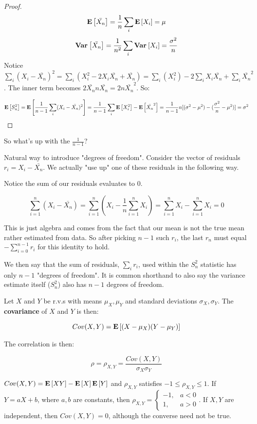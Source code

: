 \documentclass[10pt]{article}
\begin{document}
\begin{proof}
    \[\operatorname{\mathbf{E}}\left[\bar{X_n}\right] = \frac{1}{n}\sum_i \operatorname{\mathbf{E}}\left[X_i\right] = \mu\]
    \[\operatorname{\mathbf{Var}}_{}\left[\bar{X_n}\right] = \frac{1}{n^2}\sum_i \operatorname{\mathbf{Var}}_{}\left[X_i\right] = \frac{\sigma^2}{n}\]
    Notice $\sum_i (X_i - \bar{X_n})^2 = \sum_i (X_i^2 - 2 X_i \bar{X_n} +
    \bar{X_n}) = \sum_i (X_i^2) - 2 \sum_i {X_i \bar{X_n} + \sum_i
    \bar{X_n}^2}$. The inner term becomes $2 \bar{X_n} n \bar{X_n} =
    2n\bar{X_n}^2$. So:

    \[\operatorname{\mathbf{E}}\left[S^2_n\right] = \operatorname{\mathbf{E}}\left[\frac{1}{n-1} \sum_i (X_i - \bar{X_n})^2\right] = \frac{1}{n-1}
        \sum_i \operatorname{\mathbf{E}}\left[X_i^2\right] - \operatorname{\mathbf{E}}\left[\bar{X_n}^2\right] = \frac{1}{n-1}n[(\sigma^2 - \mu^2) -
        (\frac{\sigma^2}{n} - \mu^2)] = \sigma^2 \]
\end{proof}

\begin{note}
So what's up with the $\frac{1}{n-1}$?

Natural way to introduce "degrees of freedom". Consider the vector of residuals
$r_i = X_i - \bar{X_n}$. We actually "use up" one of these residuals in the following
way. 

Notice the sum of our residuals evaluates to 0. 

\[\sum_{i=1}^n (X_i - \bar{X_n}) = \sum_{i=1}^n (X_i - \frac{1}{n} \sum_{i=1}^n
X_i) = \sum_{i=1}^n X_i - \sum_{i=1}^n X_i = 0\]

This is just algebra and comes from the fact that our mean is not the true
mean rather estimated from data. So after picking $n-1$ such $r_i$, the last
$r_n$ must equal $-\sum_{i=0}^{n-1} r_i$ for this identity to hold. 

We then say that the sum of residuals, $\sum_i r_i$, used within the $S_n^2$
statistic has only $n-1$ "degrees of freedom". It is common shorthand to also
say the variance estimate itself ($S_n^2$) also has $n-1$ degrees of freedom.
\end{note}

\begin{definition}
    Let $X$ and $Y$ be r.v.s with means $\mu_X, \mu_Y$ and standard deviations
    $\sigma_X, \sigma_Y$. The \textbf{covariance} of $X$ and $Y$ is then:

    \[Cov(X, Y) = \operatorname{\mathbf{E}}\left[(X-\mu_X)(Y-\mu_Y)\right]\]

    The correlation is then:

    \[\rho = \rho_{X,Y} = \frac{Cov(X, Y)}{\sigma_X \sigma_Y}\]
\end{definition}

\begin{theorem}
    $Cov(X, Y) = \operatorname{\mathbf{E}}\left[XY\right] - \operatorname{\mathbf{E}}\left[X\right]\operatorname{\mathbf{E}}\left[Y\right]$ and $\rho_{X,Y}$ satisfies $-1 \leq
    \rho_{X,Y} \leq 1$. If $Y = aX + b$, where $a,b$ are constants, then
    $\rho_{X,Y} = \begin{cases}-1,&a<0\\1,&a>0\end{cases}$. If $X, Y$ are
    independent, then $Cov(X, Y) = 0$, although the converse need not be true.
\end{theorem}
\end{document}
